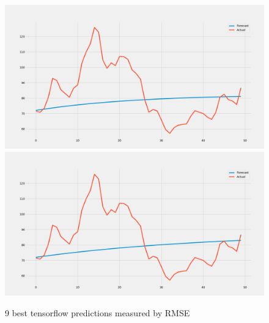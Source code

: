 \begin{figure}[H]
    \includegraphics[width=.30\textwidth]{../data/Figures/Neural networks/ForLoop_Tensor/plotmodel_52.png}\hfill
    \includegraphics[width=.30\textwidth]{../data/Figures/Neural networks/ForLoop_Tensor/plotmodel_268.png}\hfill
    \caption{9 best tensorflow predictions measured by RMSE}\label{fig:tensorflow preds}
\end{figure}

